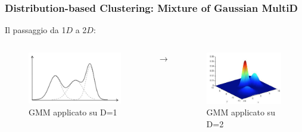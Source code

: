 {\begin{frame}
\end{frame}


\begin{frame}

	\frametitle{{\color{GradientDescentDiagramOrange}Distribution-based Clustering}: Mixture of Gaussian MultiD}

	\begin{block}{Il passaggio da 1$D$ a 2$D$:}
			
			\begin{columns}
				\begin{figure}[!htbp]
					\centering
					\includegraphics[width=0.85\linewidth]{images/unsupervised/gaussian_mixture/gmm_monovariate.png}
					\caption{GMM applicato su D=1}
				\end{figure}
					
				$\rightarrow$
				
				\pause
				
				\begin{figure}[!htbp]
					\centering
					\includegraphics[width=0.85\linewidth]{images/unsupervised/gaussian_mixture/gmm_multivariate.png}
					\caption{GMM applicato su D=2}
				\end{figure}
			\end{columns}
					

\end{block}
\end{frame}}
